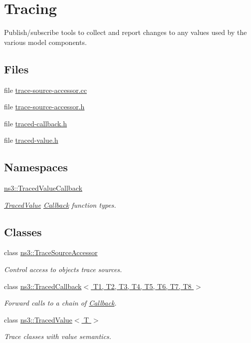 \hypertarget{group__tracing}{}\section{Tracing}
\label{group__tracing}


Publish/subscribe tools to collect and report changes to any values used by the various model components.  


\subsection*{Files}
\begin{DoxyCompactItemize}
\item 
file \hyperlink{trace-source-accessor_8cc}{trace-\/source-\/accessor.\+cc}
\item 
file \hyperlink{trace-source-accessor_8h}{trace-\/source-\/accessor.\+h}
\item 
file \hyperlink{traced-callback_8h}{traced-\/callback.\+h}
\item 
file \hyperlink{traced-value_8h}{traced-\/value.\+h}
\end{DoxyCompactItemize}
\subsection*{Namespaces}
\begin{DoxyCompactItemize}
\item 
 \hyperlink{namespacens3_1_1TracedValueCallback}{ns3\+::\+Traced\+Value\+Callback}
\begin{DoxyCompactList}\small\item\em \hyperlink{classns3_1_1TracedValue}{Traced\+Value} \hyperlink{classns3_1_1Callback}{Callback} function types. \end{DoxyCompactList}\end{DoxyCompactItemize}
\subsection*{Classes}
\begin{DoxyCompactItemize}
\item 
class \hyperlink{classns3_1_1TraceSourceAccessor}{ns3\+::\+Trace\+Source\+Accessor}
\begin{DoxyCompactList}\small\item\em Control access to objects\textquotesingle{} trace sources. \end{DoxyCompactList}\item 
class \hyperlink{classns3_1_1TracedCallback}{ns3\+::\+Traced\+Callback$<$ T1, T2, T3, T4, T5, T6, T7, T8 $>$}
\begin{DoxyCompactList}\small\item\em Forward calls to a chain of \hyperlink{classns3_1_1Callback}{Callback}. \end{DoxyCompactList}\item 
class \hyperlink{classns3_1_1TracedValue}{ns3\+::\+Traced\+Value$<$ T $>$}
\begin{DoxyCompactList}\small\item\em Trace classes with value semantics. \end{DoxyCompactList}\end{DoxyCompactItemize}
